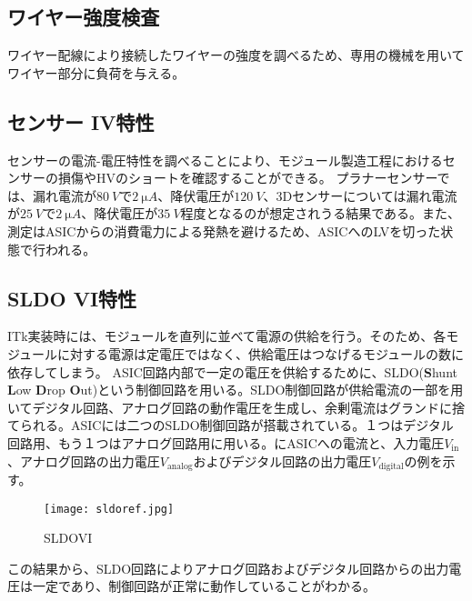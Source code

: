 \subsection{ワイヤー強度検査}
\label{sec:mass}

ワイヤー配線により接続したワイヤーの強度を調べるため、専用の機械を用いてワイヤー部分に負荷を与える。


\subsection{センサー IV特性}
\label{sec:sensoriv}
センサーの電流-電圧特性を調べることにより、モジュール製造工程におけるセンサーの損傷やHVのショートを確認することができる。
プラナーセンサーでは、漏れ電流が$80\ \si{V}$で$2\ \si{\micro A}$、降伏電圧が$120\ \si{V}$、3Dセンサーについては漏れ電流が$25\ \si{V}$で$2\ \si{\micro A}$、降伏電圧が$35\ \si{V}$程度となるのが想定されうる結果である。また、測定はASICからの消費電力による発熱を避けるため、ASICへのLVを切った状態で行われる。


\subsection{SLDO VI特性}
\label{sec:sldovi}
ITk実装時には、モジュールを直列に並べて電源の供給を行う。そのため、各モジュールに対する電源は定電圧ではなく、供給電圧はつなげるモジュールの数に依存してしまう。
ASIC回路内部で一定の電圧を供給するために、SLDO(\textbf{S}hunt \textbf{L}ow \textbf{D}rop \textbf{O}ut)という制御回路を用いる。SLDO制御回路が供給電流の一部を用いてデジタル回路、アナログ回路の動作電圧を生成し、余剰電流はグランドに捨てられる。ASICには二つのSLDO制御回路が搭載されている。１つはデジタル回路用、もう１つはアナログ回路用に用いる。にASICへの電流と、入力電圧$V_\mathrm{in}$、アナログ回路の出力電圧$V_\mathrm{analog}$およびデジタル回路の出力電圧$V_\mathrm{digital}$の例を示す。
\begin{figure}[tbp]
  \centering
  \texttt{[image: sldoref.jpg]}
  \caption[SLDOVI]{SLDOVI}
  \label{fig:sldoref}
\end{figure}
この結果から、SLDO回路によりアナログ回路およびデジタル回路からの出力電圧は一定であり、制御回路が正常に動作していることがわかる。


